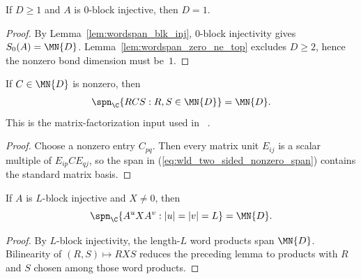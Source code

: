 \begin{corollary}
    \label{cor:blk_inj_zero_dim_one}
    \leanok
    If $D \ge 1$ and $A$ is $0$-block injective, then $D=1$.
\end{corollary}

\begin{proof}\leanok{}
    By Lemma~\ref{lem:wordspan_blk_inj}, $0$-block injectivity gives
    $S_0(A)=\MN{D}$. Lemma~\ref{lem:wordspan_zero_ne_top} excludes
    $D \ge 2$, hence the nonzero bond dimension must be~$1$.
\end{proof}

\begin{lemma}
    \label{lem:two_sided_nonzero_matrix_span}
    \leanok
    If $C \in \MN{D}$ is nonzero, then
    \begin{equation}\label{eq:wld_two_sided_nonzero_span}
        \spn_{\C}\{R C S : R, S \in \MN{D}\}=\MN{D}.
    \end{equation}
    This is the matrix-factorization input used in~%
    \cite[Lemma~3]{PerezGarcia2007Matrix}.
\end{lemma}

\begin{proof}\leanok
    Choose a nonzero entry $C_{pq}$. Then every matrix unit $E_{ij}$
    is a scalar multiple of $E_{ip} C E_{qj}$, so the span in
    (\ref{eq:wld_two_sided_nonzero_span}) contains the standard matrix basis.
\end{proof}

\begin{lemma}
    \label{lem:block_injective_two_sided_word_span}
    \leanok
    If $A$ is $L$-block injective and $X \neq 0$, then
    \[
        \spn_{\C}\{A^u X A^v : |u| = |v| = L\}=\MN{D}.
    \]
\end{lemma}

\begin{proof}\leanok{}
    By $L$-block injectivity, the length-$L$ word products span
    $\MN{D}$. Bilinearity of $(R, S)\mapsto R X S$ reduces the
    preceding lemma to products with $R$ and $S$ chosen among those
    word products.
\end{proof}

